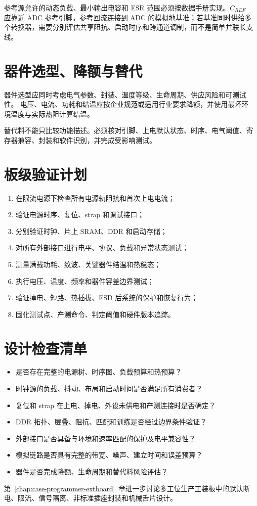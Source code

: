 参考源允许的动态负载、最小输出电容和 ESR 范围必须按数据手册实现。$C_{REF}$ 应靠近 ADC 参考引脚，参考回流连接到 ADC 的模拟地基准；若基准同时供给多个转换器，需要分别评估共享阻抗、启动时序和跨通道调制，而不是简单并联长支线。

\section{器件选型、降额与替代}

器件选型应同时考虑电气参数、封装、温度等级、生命周期、供应风险和可测试性。
电压、电流、功耗和结温应按企业规范或适用行业要求降额，并使用最坏环境温度与实际热阻计算结温。

替代料不能只比较功能描述。必须核对引脚、上电默认状态、时序、电气阈值、寄存器兼容、封装和软件识别，并完成受影响测试。

\section{板级验证计划}

\begin{enumerate}
  \item 在限流电源下检查所有电源轨阻抗和首次上电电流；
  \item 验证电源时序、复位、strap 和调试接口；
  \item 分别验证时钟、片上 SRAM、DDR 和启动存储；
  \item 对所有外部接口进行电平、协议、负载和异常状态测试；
  \item 测量满载功耗、纹波、关键器件结温和热稳态；
  \item 执行电压、温度、频率和器件容差边界测试；
  \item 验证掉电、短路、热插拔、ESD 后系统的保护和恢复行为；
  \item 固化测试点、产测命令、判定阈值和硬件版本追踪。
\end{enumerate}

\section{设计检查清单}

\begin{itemize}
  \item 是否存在完整的电源树、时序图、负载预算和热预算？
  \item 时钟源的负载、抖动、布局和启动时间是否满足所有消费者？
  \item 复位和 strap 在上电、掉电、外设未供电和产测连接时是否确定？
  \item DDR 拓扑、层叠、阻抗、匹配和训练是否经过边界条件验证？
  \item 外部接口是否具备与环境和速率匹配的保护及电平兼容性？
  \item 模拟链路是否具有完整的带宽、噪声、建立时间和误差预算？
  \item 器件是否完成降额、生命周期和替代料风险评估？
\end{itemize}

第~\ref{chap:case-programmer-extboard}~章进一步讨论多工位生产工装板中的默认断电、限流、信号隔离、非标准插座封装和机械舌片设计。
